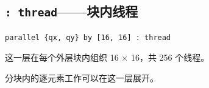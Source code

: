 \subsection*{\texttt{: thread}——块内线程}

\begin{lstlisting}[language=croqtile,caption={: thread——块内线程}]
parallel {qx, qy} by [16, 16] : thread
\end{lstlisting}

这一层在每个外层块内组织 16 × 16，共 256 个线程。

分块内的逐元素工作可以在这一层展开。
